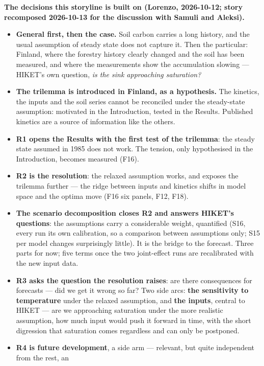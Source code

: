 \documentclass[11pt]{article}
\begin{document}
\begin{ann}
\textbf{The decisions this storyline is built on (Lorenzo, 2026-10-12; story recomposed 2026-10-13 for the
discussion with Samuli and Aleksi).}
\begin{itemize}\itemsep0pt
  \item \textbf{General first, then the case.} Soil carbon carries a long history, and the usual assumption of
    steady state does not capture it. Then the particular: Finland, where the forestry history clearly
    changed and the soil has been measured, and where the measurements show the accumulation slowing ---
    HIKET's own question, \emph{is the sink approaching saturation?}
  \item \textbf{The trilemma is introduced in Finland, as a hypothesis.} The kinetics, the inputs and the soil
    series cannot be reconciled under the steady-state assumption: motivated in the Introduction, tested
    in the Results. Published kinetics are a source of information like the others.
  \item \textbf{R1 opens the Results with the first test of the trilemma}: the steady state assumed in 1985
    does not work. The tension, only hypothesised in the Introduction, becomes measured (F16).
  \item \textbf{R2 is the resolution}: the relaxed assumption works, and exposes the trilemma further --- the
    ridge between inputs and kinetics shifts in model space and the optima move (F16 six panels, F12, F18).
  \item \textbf{The scenario decomposition closes R2 and answers HIKET's questions}: the assumptions carry a
    considerable weight, quantified (S16, every run its own calibration, so a comparison between
    assumptions only; S15 per model changes surprisingly little). It is the bridge to the forecast. Three parts
    for now; five terms once the two joint-effect runs are recalibrated with the new input data.
  \item \textbf{R3 asks the question the resolution raises}: are there consequences for forecasts --- did we
    get it wrong so far? Two side arcs: \textbf{the sensitivity to temperature} under the relaxed assumption,
    and \textbf{the inputs}, central to HIKET --- are we approaching saturation under the more realistic
    assumption, how much input would push it forward in time, with the short digression that saturation
    comes regardless and can only be postponed.
  \item \textbf{R4 is future development}, a side arm --- relevant, but quite independent from the rest, an

\end{itemize}
\end{ann}
\end{document}
